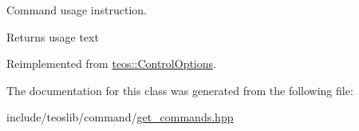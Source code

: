 Command \textquotesingle{}usage\textquotesingle{} instruction. 

\begin{DoxyReturn}{Returns}
usage text 
\end{DoxyReturn}


Reimplemented from \mbox{\hyperlink{classteos_1_1_control_options_a0aa5671f9bc750ed5280c26c543874f3}{teos\+::\+Control\+Options}}.



The documentation for this class was generated from the following file\+:\begin{DoxyCompactItemize}
\item 
include/teoslib/command/\mbox{\hyperlink{get__commands_8hpp}{get\+\_\+commands.\+hpp}}\end{DoxyCompactItemize}
